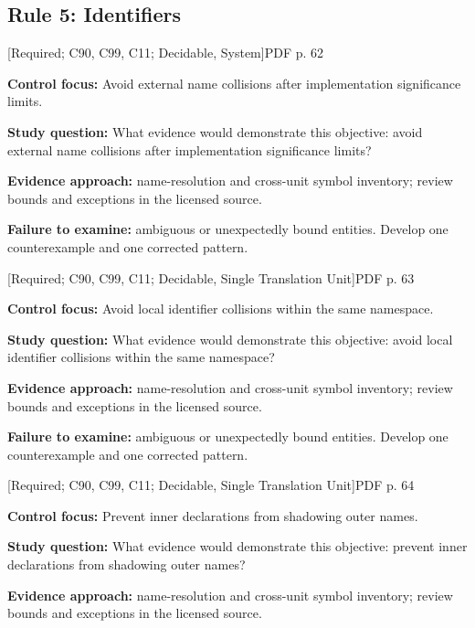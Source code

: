 \documentclass[10pt,letterpaper]{article}
\begin{document}
\subsection{Rule 5: Identifiers}
 \textsf{\footnotesize [Required; C90, C99, C11; Decidable, System]}\hfill{\footnotesize PDF p. 62}\par
\textbf{Control focus:} Avoid external name collisions after implementation significance limits.\par
\textbf{Study question:} What evidence would demonstrate this objective: avoid external name collisions after implementation significance limits?\par
\textbf{Evidence approach:} name-resolution and cross-unit symbol inventory; review bounds and exceptions in the licensed source.\par
\textbf{Failure to examine:} ambiguous or unexpectedly bound entities. Develop one counterexample and one corrected pattern.\par
\smallskip
{}
 \textsf{\footnotesize [Required; C90, C99, C11; Decidable, Single Translation Unit]}\hfill{\footnotesize PDF p. 63}\par
\textbf{Control focus:} Avoid local identifier collisions within the same namespace.\par
\textbf{Study question:} What evidence would demonstrate this objective: avoid local identifier collisions within the same namespace?\par
\textbf{Evidence approach:} name-resolution and cross-unit symbol inventory; review bounds and exceptions in the licensed source.\par
\textbf{Failure to examine:} ambiguous or unexpectedly bound entities. Develop one counterexample and one corrected pattern.\par
\smallskip
{}
 \textsf{\footnotesize [Required; C90, C99, C11; Decidable, Single Translation Unit]}\hfill{\footnotesize PDF p. 64}\par
\textbf{Control focus:} Prevent inner declarations from shadowing outer names.\par
\textbf{Study question:} What evidence would demonstrate this objective: prevent inner declarations from shadowing outer names?\par
\textbf{Evidence approach:} name-resolution and cross-unit symbol inventory; review bounds and exceptions in the licensed source.\par
\end{document}
